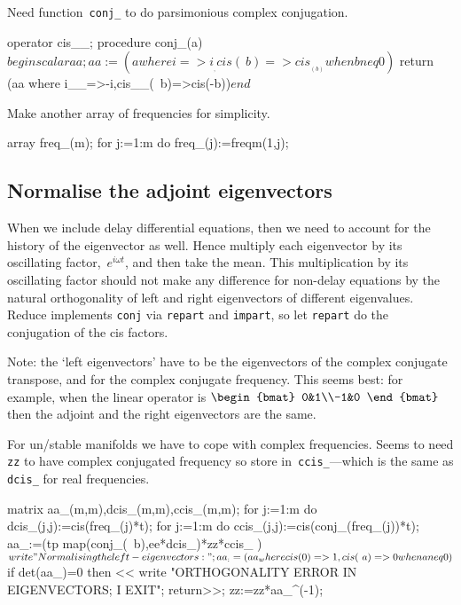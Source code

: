 \documentclass[11pt,a5paper]{article}
\begin{document}
Need function~\verb|conj_| to do parsimonious complex
conjugation.
\begin{reduce}
operator cis__;
procedure conj_(a)$ begin scalar aa;
    aa:=(a where {i=>i__, cis(~b)=>cis__(b) when b neq 0})$
    return (aa where {i__=>-i,cis__(~b)=>cis(-b)})$
    end$
\end{reduce}

Make another array of frequencies for simplicity.
\begin{reduce}
array freq_(m);
for j:=1:m do freq_(j):=freqm(1,j);
\end{reduce}



\subsection{Normalise the adjoint eigenvectors}
When we include delay differential equations, then we need
to account for the history of the eigenvector as well. Hence
multiply each eigenvector by its oscillating
factor,~\(e^{i\omega t}\), and then take the mean. This
multiplication by its oscillating factor should not make any
difference for non-delay equations by the natural
orthogonality of left and right eigenvectors of different
eigenvalues. Reduce implements \verb|conj| via \verb|repart|
and \verb|impart|, so let \verb|repart| do the conjugation
of the cis factors.

Note: the `left eigenvectors' have to be the eigenvectors of
the complex conjugate transpose, and for the complex
conjugate frequency. This seems best: for example, when the
linear operator is \(\begin{bmat} 0&1\\-1&0 \end{bmat}\)
then the adjoint and the right eigenvectors are the same.

For un/stable manifolds we have to cope with complex
frequencies. Seems to need \verb|zz| to have complex
conjugated frequency so store in~\verb|ccis_|---which is the
same as \verb|dcis_| for real frequencies.

\begin{reduce}
matrix aa_(m,m),dcis_(m,m),ccis_(m,m);
for j:=1:m do dcis_(j,j):=cis(freq_(j)*t);
for j:=1:m do ccis_(j,j):=cis(conj_(freq_(j))*t);
aa_:=(tp map(conj_(~b),ee*dcis_)*zz*ccis_ )$
write "Normalising the left-eigenvectors:";
aa_:=(aa_ where {cis(0)=>1, cis(~a)=>0 when a neq 0})$
if det(aa_)=0 then << write
    "ORTHOGONALITY ERROR IN EIGENVECTORS; I EXIT"; 
    return>>;
zz:=zz*aa_^(-1);
\end{reduce}
\end{document}
